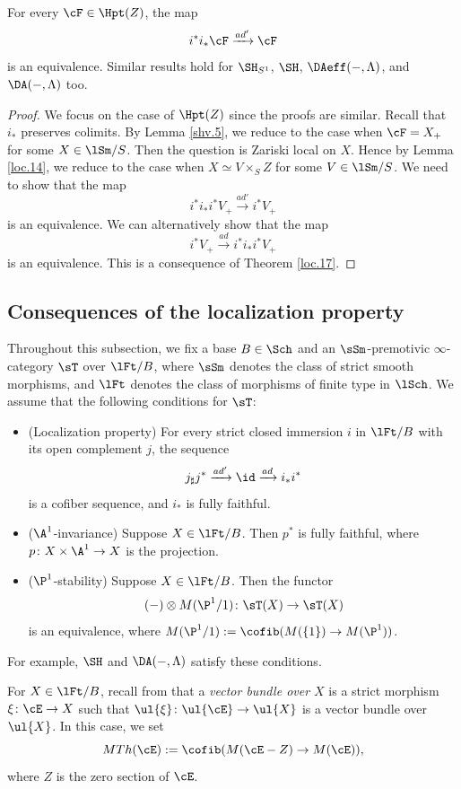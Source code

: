 \documentclass[10pt]{amsart}
\begin{document}
\begin{prop}
For every $\cF\in \Hpt(Z)$, the map
\[
i^*i_*\cF \xrightarrow{ad'} \cF
\]
is an equivalence.
Similar results hold for $\SH_{S^1}$, $\SH$, $\DAeff(-,\Lambda)$, and $\DA(-,\Lambda)$ too.
\end{prop}
\begin{proof}
We focus on the case of $\Hpt(Z)$ since the proofs are similar.
Recall that $i_*$ preserves colimits.
By Lemma \ref{shv.5}, we reduce to the case when $\cF=X_+$ for some $X\in \lSm/S$.
Then the question is Zariski local on $X$.
Hence by Lemma \ref{loc.14}, we reduce to the case when $X\simeq V\times_S Z$ for some $V\in \lSm/S$.
We need to show that the map
\[
i^*i_*i^*V_+\xrightarrow{ad'} i^*V_+
\]
is an equivalence.
We can alternatively show that the map
\[
i^*V_+\xrightarrow{ad} i^*i_*i^*V_+
\]
is an equivalence.
This is a consequence of Theorem \ref{loc.17}.
\end{proof}

\subsection{Consequences of the localization property}
\label{consequences}


Throughout this subsection, we fix a base $B\in \Sch$ and an $\sSm$-premotivic $\infty$-category $\sT$ over $\lFt/B$, where $\sSm$ denotes the class of strict smooth morphisms, and $\lFt$ denotes the class of morphisms of finite type in $\lSch$.
We assume that the following conditions for $\sT$:
\begin{itemize}
\item (Localization property) For every strict closed immersion $i$ in $\lFt/B$ with its open complement $j$, the sequence
\[
j_\sharp j^*\xrightarrow{ad'} \id \xrightarrow{ad} i_*i^*
\]
is a cofiber sequence, and $i_*$ is fully faithful.
\item ($\A^1$-invariance) Suppose $X\in \lFt/B$.
Then $p^*$ is fully faithful, where $p\colon X\times \A^1\to X$ is the projection.
\item ($\P^1$-stability) Suppose $X\in \lFt/B$.
Then the functor
\[
(-)\otimes M(\P^1/1) \colon \sT(X)\to \sT(X)
\]
is an equivalence, where $M(\P^1/1):=\cofib(M(\{1\})\to M(\P^1))$.
\end{itemize}
For example, $\SH$ and $\DA(-,\Lambda)$ satisfy these conditions.

\begin{df}
For $X\in \lFt/B$, recall from \cite[Definition 7.1.2]{logDM} that a \emph{vector bundle over $X$} is a strict morphism $\xi\colon \cE\to X$ such that $\ul{\xi}\colon \ul{\cE}\to \ul{X}$ is a vector bundle over $\ul{X}$.
In this case, we set
\[
MTh(\cE)
:=
\cofib(M(\cE-Z) \to M(\cE)),
\]
where $Z$ is the zero section of $\cE$.
\end{df}
\end{document}
